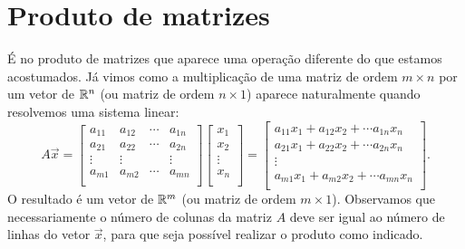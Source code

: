 \documentclass[../livro.tex]{subfiles}  %
\begin{document}
\section{Produto de matrizes}

É no produto de matrizes que aparece uma operação diferente do que estamos acostumados. Já vimos como a multiplicação de uma matriz de ordem $m\times n$ por um vetor de $\mathbb{R}^n$ (ou matriz de ordem $n\times 1$) aparece naturalmente quando resolvemos uma sistema linear:
\[
A \vec{x} = \left[
\begin{array}{cccc}
a_{11} & a_{12} & \cdots & a_{1n} \\
a_{21} & a_{22} & \cdots & a_{2n} \\
\vdots & \vdots &        & \vdots \\
a_{m1} & a_{m2} & \cdots & a_{mn} \\
\end{array}
\right]
\left[
\begin{array}{c}
x_{1} \\
x_{2} \\
\vdots \\
x_{n} \\
\end{array}
\right] =
\left[
\begin{array}{c}
a_{11} x_{1} + a_{12} x_{2} + \cdots  a_{1n} x_{n} \\
a_{21} x_{1} + a_{22} x_{2} + \cdots  a_{2n} x_{n} \\
\vdots \\
a_{m1} x_{1} + a_{m2} x_{2} + \cdots  a_{mn} x_{n} \\
\end{array}
\right].
\] O resultado é um vetor  de $\mathbb{R}^m$ (ou matriz de ordem $m\times 1$). Observamos que necessariamente o número de colunas da matriz $A$ deve ser igual ao número de linhas do vetor $\vec{x}$, para que seja possível realizar o produto como indicado.
\end{document}
